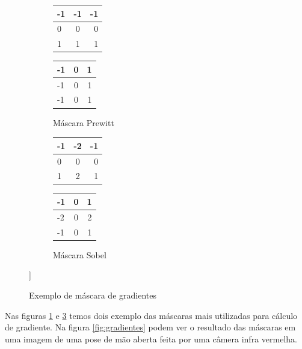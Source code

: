 \begin{figure}
	\centering
	\begin{subfigure}[b]{0.3\textwidth}
	\begin{center}
		\begin{tabular}{| l | c | r |}
		\hline
		-1 & -1 & -1 	\\ \hline
		0 & 0 & 0 		\\ \hline
		1 & 1 & 1 		\\ \hline
		\end{tabular}
		\begin{tabular}{| l | c | r |}
		\hline
		-1 & 0 & 1	 	\\ \hline
		-1 & 0 & 1 		\\ \hline
		-1 & 0 & 1 		\\ \hline
		\end{tabular}
		\caption{Máscara Prewitt}
		\label{fig:gradiente_prewitt}
	\end{center}
	\end{subfigure}
	\begin{subfigure}[b]{0.3\textwidth}
	\begin{center}
		\begin{tabular}{| l | c | r |}
		\hline
		-1 & -2 & -1 	\\ \hline
		0 & 0 & 0 		\\ \hline
		1 & 2 & 1 		\\ \hline
		\end{tabular}
		\begin{tabular}{| l | c | r |}
		\hline
		-1 & 0 & 1	 	\\ \hline
		-2 & 0 & 2 		\\ \hline
		-1 & 0 & 1 		\\ \hline
		\end{tabular}
		\caption{Máscara Sobel}
		\label{fig:gradiente_sobel}
	\end{center}
	\end{subfigure}]
	\caption{Exemplo de máscara de gradientes}
\end{figure}

Nas figuras \ref{fig:gradiente_prewitt} e \ref{fig:gradiente_sobel} temos dois exemplo das máscaras mais utilizadas para cálculo de gradiente. Na figura \ref{fig:gradientes} podem ver o resultado das máscaras em uma imagem de uma pose de mão aberta feita por uma câmera infra vermelha.

